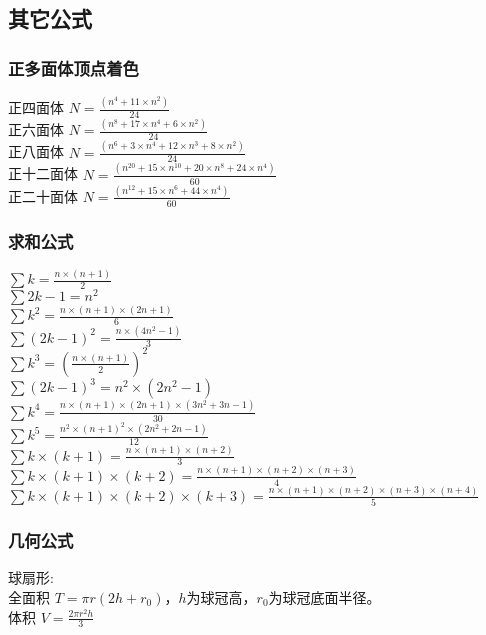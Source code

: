 \subsection{其它公式}
    \subsubsection{正多面体顶点着色}
	正四面体  $N = \frac{(n^{4}+11\times n^{2})}{24}$\\
	正六面体  $N = \frac{(n^{8}+17\times n^{4}+6\times n^{2})}{24}$\\
	正八面体  $N = \frac{(n^{6}+3\times n^{4}+12\times n^{3}+8\times n^{2})}{24}$\\
	正十二面体  $N = \frac{(n^{20}+15\times n^{10}+20\times n^{8}+24\times n^{4})}{60}$\\
	正二十面体  $N = \frac{(n^{12}+15\times n^{6}+44\times n^{4})}{60}$\\
    \subsubsection{求和公式}
	$\sum{k} = \frac{n\times (n+1)}{2}$\\
	$\sum{2k-1} = n^{2}$\\
	$\sum{k^{2}} = \frac{n\times (n+1)\times (2n+1)}{6}$\\
	$\sum{(2k-1)^{2}} = \frac{n\times (4n^{2}-1)}{3}$\\
	$\sum{k^{3}} = (\frac{n\times (n+1)}{2})^{2}$\\
	$\sum{(2k-1)^{3}} = n^{2}\times (2n^{2}-1)$\\
	$\sum{k^{4}} = \frac{n\times (n+1)\times (2n+1)\times (3n^{2}+3n-1)}{30}$\\
	$\sum{k^{5}} = \frac{n^{2}\times (n+1)^{2}\times (2n^{2}+2n-1)}{12}$\\
	$\sum{k\times (k+1)} = \frac{n\times (n+1)\times (n+2)}{3}$\\
	$\sum{k\times (k+1)\times (k+2)} = \frac{n\times (n+1)\times (n+2)\times (n+3)}{4}$\\
	$\sum{k\times (k+1)\times (k+2)\times (k+3)} = \frac{n\times (n+1)\times (n+2)\times (n+3)\times (n+4)}{5}$\\
    \subsubsection{几何公式}
	球扇形:
\\
	全面积 $T = \pi r(2h+r_0)$，$h$为球冠高，$r_0$为球冠底面半径。\\
	体积 $V = \frac{2\pi r^{2}h}{3}$\\